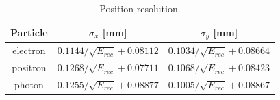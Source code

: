 \begin{table}[H]
\caption{Position resolution.}
\label{tab:PosnResTable}
\centering
\begin{tabular}{|c|c|c|}
\toprule
Particle & $\sigma_x$ [mm] & $\sigma_y$ [mm] \\
\midrule
electron & $0.1144/\sqrt{E_{rec}}+0.08112$ & $0.1034/\sqrt{E_{rec}}+0.08664$ \\
positron & $0.1268/\sqrt{E_{rec}}+0.07711$ & $0.1068/\sqrt{E_{rec}}+0.08423$ \\
photon & $0.1255/\sqrt{E_{rec}}+0.08877$ & $0.1005/\sqrt{E_{rec}}+0.08867$ \\
\bottomrule
\end{tabular}
\end{table}